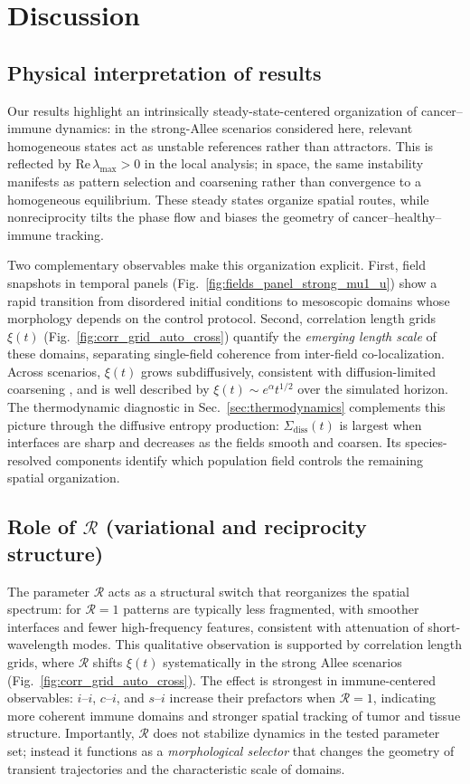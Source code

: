 \section{Discussion}\label{sec:discussion}

\subsection{Physical interpretation of results}
Our results highlight an intrinsically steady-state-centered organization of cancer--immune dynamics: in the strong-Allee scenarios considered here, relevant homogeneous states act as unstable references rather than attractors. This is reflected by Re\,$\lambda_{\max}>0$ in the local analysis; in space, the same instability manifests as pattern selection and coarsening rather than convergence to a homogeneous equilibrium. These steady states organize spatial routes, while nonreciprocity tilts the phase flow and biases the geometry of cancer--healthy--immune tracking.

Two complementary observables make this organization explicit. First, field snapshots in temporal panels (Fig.~\ref{fig:fields_panel_strong_mu1_u}) show a rapid transition from disordered initial conditions to mesoscopic domains whose morphology depends on the control protocol. Second, correlation length grids $\xi(t)$ (Fig.~\ref{fig:corr_grid_auto_cross}) quantify the \emph{emerging length scale} of these domains, separating single-field coherence from inter-field co-localization. Across scenarios, $\xi(t)$ grows subdiffusively, consistent with diffusion-limited coarsening \cite{bray1994}, and is well described by $\xi(t)\sim e^{\alpha}t^{1/2}$ over the simulated horizon. The thermodynamic diagnostic in Sec.~\ref{sec:thermodynamics} complements this picture through the diffusive entropy production: $\Sigma_{\mathrm{diss}}(t)$ is largest when interfaces are sharp and decreases as the fields smooth and coarsen. Its species-resolved components identify which population field controls the remaining spatial organization.

\subsection{Role of \texorpdfstring{$\mathcal{R}$}{R} (variational and reciprocity structure)}
The parameter $\mathcal{R}$ acts as a structural switch that reorganizes the spatial spectrum: for $\mathcal{R}=1$ patterns are typically less fragmented, with smoother interfaces and fewer high-frequency features, consistent with attenuation of short-wavelength modes. This qualitative observation is supported by correlation length grids, where $\mathcal{R}$ shifts $\xi(t)$ systematically in the strong Allee scenarios (Fig.~\ref{fig:corr_grid_auto_cross}). The effect is strongest in immune-centered observables: $i$--$i$, $c$--$i$, and $s$--$i$ increase their prefactors when $\mathcal{R}=1$, indicating more coherent immune domains and stronger spatial tracking of tumor and tissue structure. Importantly, $\mathcal{R}$ does not stabilize dynamics in the tested parameter set; instead it functions as a \emph{morphological selector} that changes the geometry of transient trajectories and the characteristic scale of domains.

